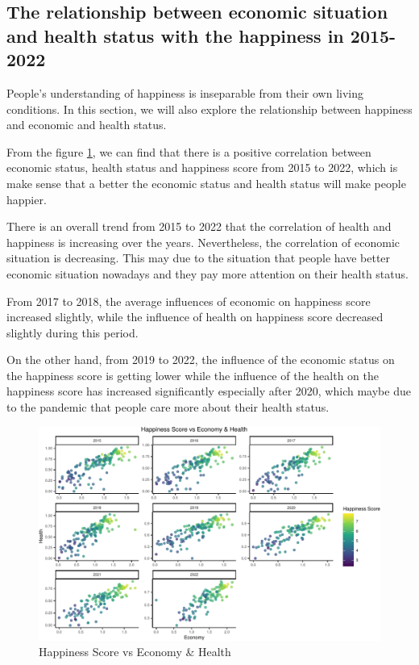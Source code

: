 \documentclass[11pt,a4paper,]{article}
\begin{document}
\hypertarget{the-relationship-between-economic-situation-and-health-status-with-the-happiness-in-2015-2022}{%
\subsection{The relationship between economic situation and health status with the happiness in 2015-2022}\label{the-relationship-between-economic-situation-and-health-status-with-the-happiness-in-2015-2022}}

People's understanding of happiness is inseparable from their own living conditions. In this section, we will also explore the relationship between happiness and economic and health status.

From the figure \ref{fig:VS}, we can find that there is a positive correlation between economic status, health status and happiness score from 2015 to 2022, which is make sense that a better the economic status and health status will make people happier.

There is an overall trend from 2015 to 2022 that the correlation of health and happiness is increasing over the years. Nevertheless, the correlation of economic situation is decreasing. This may due to the situation that people have better economic situation nowadays and they pay more attention on their health status.

From 2017 to 2018, the average influences of economic on happiness score increased slightly, while the influence of health on happiness score decreased slightly during this period.

On the other hand, from 2019 to 2022, the influence of the economic status on the happiness score is getting lower while the influence of the health on the happiness score has increased significantly especially after 2020, which maybe due to the pandemic that people care more about their health status.

\begin{figure}
\centering
\includegraphics{Assignment4_files/figure-latex/VS-1.pdf}
\caption{\label{fig:VS}Happiness Score vs Economy \& Health}
\end{figure}
\end{document}
